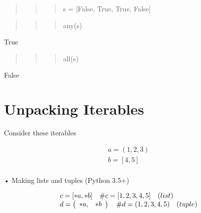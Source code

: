 \documentclass[
  letterpaper,
  DIV=11,
  numbers=noendperiod]{scrreprt}
\begin{document}
\begin{quote}
\begin{quote}
\begin{quote}
s = {[}False, True, True, False{]}
\end{quote}
\end{quote}
\end{quote}

\begin{quote}
\begin{quote}
\begin{quote}
any(s)
\end{quote}
\end{quote}
\end{quote}

True

\begin{quote}
\begin{quote}
\begin{quote}
all(s)
\end{quote}
\end{quote}
\end{quote}

False

\begin{quote}
\begin{quote}
\begin{quote}
\end{quote}
\end{quote}
\end{quote}


\chapter{Unpacking Iterables}\label{unpacking-iterables}

Consider these iterables

\[
\begin{array}{l} a = (1, 2, 3) \\ b = [ 4, 5 ] \\ \end{array}
\]

• Making lists and tuples (Python 3.5+)

\[
\begin{array}{l} c = [ * a, * b ] \quad \# c = [ 1, 2, 3, 4, 5 ] \quad (l i s t) \\ d = \left( \begin{array}{l l} * a, & * b \end{array} \right) \quad \# d = (1, 2, 3, 4, 5) \quad (t u p l e) \\ \end{array}
\]
\end{document}
